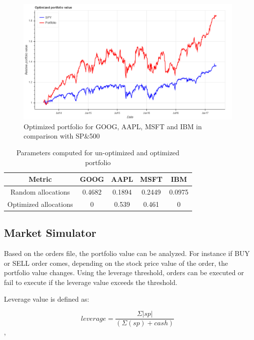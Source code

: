 \documentclass[12pt]{article}
\begin{document}
\begin{itemize}
\begin{figure}[!htbp]
\label{fig:optimized}
\begin{center}
\includegraphics[height=0.5\textheight,width=\textwidth]{optimized.png}
\caption{Optimized portfolio for GOOG, AAPL, MSFT and IBM in comparison with SP\&500}
\end{center}
\end{figure}

\begin{table}
\begin{center}
\begin{tabular} {|c|c|c|c|c|}
\hline \hline
\textbf{Metric} & \textbf{GOOG} & \textbf{AAPL} & \textbf{MSFT} & \textbf{IBM} \\ \hline
Random allocations & 0.4682 & 0.1894 &0.2449 &0.0975 \\ \hline
Optimized allocations & 0 & 0.539 & 0.461 & 0 \\ \hline
\hline
\end{tabular}
\end{center}
\caption{Parameters computed for un-optimized and optimized portfolio}
\end{table}

\subsection{Market Simulator}
\label{sec:sim}
Based on the orders file, the portfolio value can be analyzed. For instance if BUY or SELL order comes, depending on the stock price value of the order, the portfolio value changes. Using the leverage threshold, orders can be executed or fail to execute if the leverage value exceeds the threshold.

Leverage value is defined as:

\[ leverage = \frac{\Sigma|sp|} {(\Sigma(sp) + cash) }\],


\end{itemize}
\end{document}
